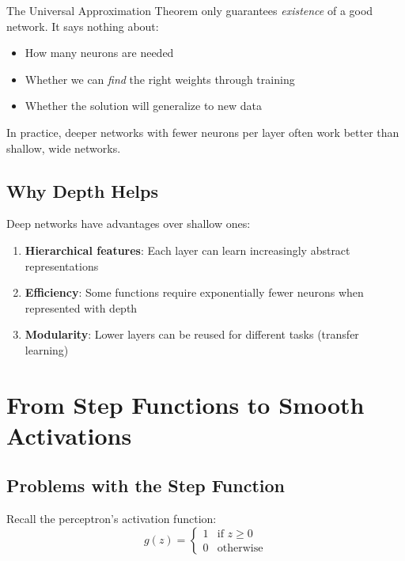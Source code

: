 \begin{importantbox}
The Universal Approximation Theorem only guarantees \textit{existence} of a good network. It says nothing about:
\begin{itemize}
    \item How many neurons are needed
    \item Whether we can \textit{find} the right weights through training
    \item Whether the solution will generalize to new data
\end{itemize}

In practice, deeper networks with fewer neurons per layer often work better than shallow, wide networks.
\end{importantbox}

\subsection{Why Depth Helps}

Deep networks have advantages over shallow ones:

\begin{enumerate}
    \item \textbf{Hierarchical features}: Each layer can learn increasingly abstract representations
    \item \textbf{Efficiency}: Some functions require exponentially fewer neurons when represented with depth
    \item \textbf{Modularity}: Lower layers can be reused for different tasks (transfer learning)
\end{enumerate}


\section{From Step Functions to Smooth Activations}

\subsection{Problems with the Step Function}

Recall the perceptron's activation function:
\[
g(z) = \begin{cases} 1 & \text{if } z \geq 0 \\ 0 & \text{otherwise} \end{cases}
\]

